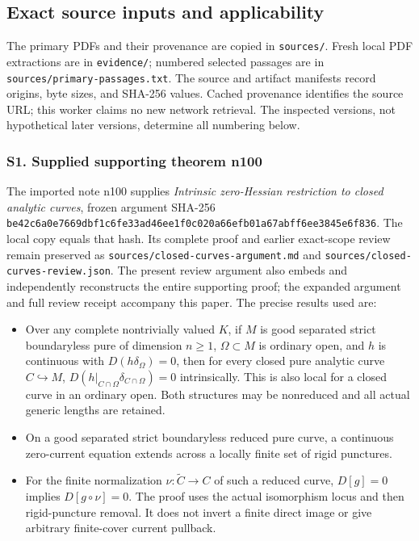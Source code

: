 \documentclass[
  11pt,
]{article}
\providecommand{\tightlist}{%
  \setlength{\itemsep}{0pt}\setlength{\parskip}{0pt}}
\begin{document}
\subsection{Exact source inputs and
applicability}\label{exact-source-inputs-and-applicability}

The primary PDFs and their provenance are copied in \texttt{sources/}.
Fresh local PDF extractions are in \texttt{evidence/}; numbered selected
passages are in \texttt{sources/primary-passages.txt}. The source and
artifact manifests record origins, byte sizes, and SHA-256 values.
Cached provenance identifies the source URL; this worker claims no new
network retrieval. The inspected versions, not hypothetical later
versions, determine all numbering below.

\subsubsection{S1. Supplied supporting theorem
n100}\label{s1.-supplied-supporting-theorem-n100}

The imported note n100 supplies \emph{Intrinsic zero-Hessian restriction
to closed analytic curves}, frozen argument SHA-256
\texttt{be42c6a0e7669dbf1c6fe33ad46ee1f0c020a66efb01a67abff6ee3845e6f836}.
The local copy equals that hash. Its complete proof and earlier exact-scope
review remain preserved as \texttt{sources/closed-curves-argument.md} and
\texttt{sources/closed-curves-review.json}. The present review argument
also embeds and independently reconstructs the entire supporting proof;
the expanded argument and full review receipt accompany this paper.
The precise results used
are:

\begin{itemize}
\tightlist
\item
  Over any complete nontrivially valued \(K\), if \(M\) is good
  separated strict boundaryless pure of dimension \(n\geq1\),
  \(\Omega\subset M\) is ordinary open, and \(h\) is continuous with
  \(D(h\delta_\Omega)=0\), then for every closed pure analytic curve
  \(C\hookrightarrow M\), \(D(h|_{C\cap\Omega}\delta_{C\cap\Omega})=0\)
  intrinsically. This is also local for a closed curve in an ordinary
  open. Both structures may be nonreduced and all actual generic lengths
  are retained.
\item
  On a good separated strict boundaryless reduced pure curve, a
  continuous zero-current equation extends across a locally finite set
  of rigid punctures.
\item
  For the finite normalization \(\nu:\widetilde C\to C\) of such a
  reduced curve, \(D[g]=0\) implies \(D[g\circ\nu]=0\). The proof uses
  the actual isomorphism locus and then rigid-puncture removal. It does
  not invert a finite direct image or give arbitrary finite-cover
  current pullback.
\end{itemize}
\end{document}
